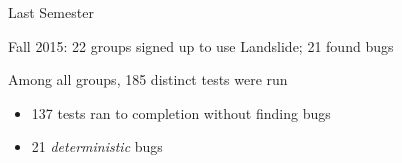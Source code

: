 \documentclass[xcolor=dvipsnames]{beamer}
\begin{document}
\begin{frame}{Last Semester}

	Fall 2015: 22 groups signed up to use Landslide; 21 found bugs
	\linegap

	Among all groups, 185 distinct tests were run
	\begin{itemize}
		\item 137 tests ran to completion without finding bugs
		\item 21 {\em deterministic} bugs
	\end{itemize}
	\pause %
	\linegap


\end{frame}
\end{document}
